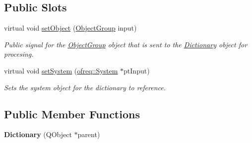 \subsection*{Public Slots}
\begin{DoxyCompactItemize}
\item 
virtual void \hyperlink{classosea_1_1_dictionary_a900221a385d133644aedcadbae90c2be}{set\-Object} (\hyperlink{classosea_1_1_object_group}{Object\-Group} input)
\begin{DoxyCompactList}\small\item\em Public signal for the \hyperlink{classosea_1_1_object_group}{Object\-Group} object that is sent to the \hyperlink{classosea_1_1_dictionary}{Dictionary} object for procesing. \end{DoxyCompactList}\item 
virtual void \hyperlink{classosea_1_1_dictionary_a4f5b4ce990794a633ff8b69b8c021b66}{set\-System} (\hyperlink{classosea_1_1ofreq_1_1_system}{ofreq\-::\-System} $\ast$pt\-Input)
\begin{DoxyCompactList}\small\item\em Sets the system object for the dictionary to reference. \end{DoxyCompactList}\end{DoxyCompactItemize}
\subsection*{Public Member Functions}
\begin{DoxyCompactItemize}
\item 
\hypertarget{classosea_1_1_dictionary_a6ff9dd5005c8796e0cc13a8bc4cb2288}{{\bfseries Dictionary} (Q\-Object $\ast$parent)}\label{classosea_1_1_dictionary_a6ff9dd5005c8796e0cc13a8bc4cb2288}

\end{DoxyCompactItemize}

